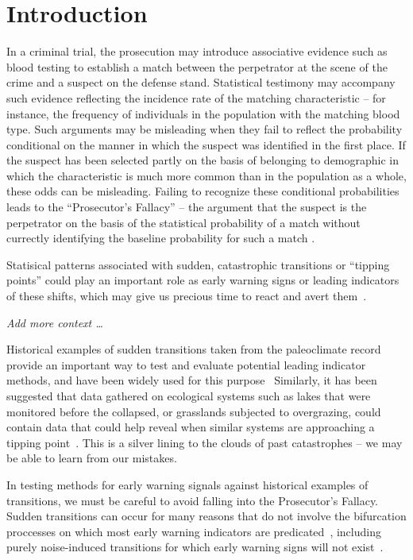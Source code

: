 \documentclass[authoryear,review,12pt]{elsarticle}
\begin{document}
\section{Introduction}
In a criminal trial, the prosecution may introduce associative evidence such as 
blood testing to establish a match between the perpetrator at the scene of the
crime and a suspect on the defense stand.  Statistical testimony may accompany 
such evidence reflecting the incidence rate of the matching characteristic -- 
for instance, the frequency of individuals in the population with the matching
blood type.  Such arguments may be misleading when they fail to reflect the 
probability conditional on the manner in which the suspect was identified in 
the first place.  If the suspect has been selected partly on the basis of belonging
to demographic in which the characteristic is much more common than in the 
population as a whole, these odds can be misleading.  Failing to recognize 
these conditional probabilities leads to the ``Prosecutor's Fallacy'' -- the argument
that the suspect is the perpetrator on the basis of the statistical probability 
of a match without currectly identifying the baseline probability for such a match
\citep{Thompson1987}.

Statisical patterns associated with sudden, catastrophic transitions or ``tipping points''
could play an important role as early warning signs or leading indicators of
these shifts, which may give us precious time to react and avert them~\citep{Scheffer2009, Lenton2011}.


\emph{Add more context \dots }



Historical examples of sudden transitions taken from the paleoclimate record
provide an important way to test and evaluate potential leading indicator methods,
and have been widely used for this purpose~\citep{Livina2007,Dakos2008,Lenton2012,Ditlevsen2010,Guttal2008,Thompson2010} 
Similarly, it has been suggested that data gathered on ecological systems such as lakes
that were monitored before the collapsed, or grasslands subjected to overgrazing,
could contain data that could help reveal when similar systems are approaching 
a tipping point~\citet{Inman2011}.  This is a silver lining to the clouds of past
catastrophes -- we may be able to learn from our mistakes. 

In testing methods for early warning signals against historical examples of transitions,
we must be careful to avoid falling into the Prosecutor's Fallacy.  Sudden transitions
can occur for many reasons that do not involve the bifurcation proccesses on which
most early warning indicators are predicated~\citep{Hastings2010}, including purely
noise-induced transitions for which early warning signs will not exist~\citep{Ditlevsen2010, Lenton2011}.
\end{document}
